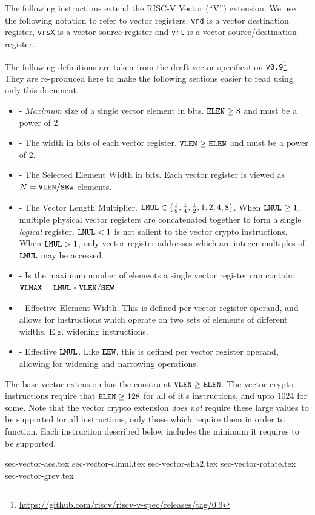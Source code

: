 
The following instructions extend the RISC-V Vector (``V'') extension.
We use the following notation to refer to vector registers:
{\tt vrd}  is a vector        destination register,
{\tt vrsX} is a vector source             register
and
{\tt vrt}  is a vector source/destination register.

The following definitions are taken from the draft
vector specification {\tt v0.9}\footnote{\url{https://github.com/riscv/riscv-v-spec/releases/tag/0.9}}.
They are re-produced here to make the following sections easier to
read using only this document.

\begin{itemize}
\item[\ELEN] - {\em Maximum} size of a single vector element in bits.
              ${\tt ELEN} \ge 8$ and must be a power of $2$.
\item[\VLEN] - The width in bits of each vector register.
              ${\tt VLEN} \ge {\tt ELEN}$ and must be a power of $2$.
\item[\SEW]  - The Selected Element Width in bits.
              Each vector register is viewed as $N={\tt VLEN}/{\tt SEW}$ elements.
\item[\LMUL] - The Vector Length Multiplier.
              ${\tt LMUL}\in\{{1\over 8},{1\over 4},{1\over 2},1,2,4,8\}$.
              When ${\tt LMUL}\ge1$, multiple physical vector registers are
              concatenated together to form a single {\em logical} register.
              ${\tt LMUL}<1$ is not salient to the vector crypto instructions.
              When ${\tt LMUL}>1$, only vector register addresses which are
              integer multiples of ${\tt LMUL}$ may be accessed.
\item[\VLMAX]- Is the maximum number of elements a single vector register
              can contain: ${\tt VLMAX}={\tt LMUL}*{\tt VLEN}/{\tt SEW}$.
\item[\EEW]  - Effective Element Width. This is defined per vector register
              operand, and allows for instructions which operate on
              two sets of elements of different widths. E.g. widening
              instructions.
\item[\EMUL] - Effective ${\tt LMUL}$. Like ${\tt EEW}$, this is defined per vector
              register operand, allowing for widening and narrowing
              operations.
\end{itemize}

The base vector extension has the constraint ${\tt VLEN} \ge {\tt ELEN}$.
The vector crypto instructions require that ${\tt ELEN} \ge 128$ for all
of it's instructions, and upto $1024$ for some.
Note that the vector crypto extension {\em does not} require these
large \ELEN values to be supported for all instructions, only those
which require them in order to function.
Each instruction described below includes the minimum \ELEN it
requires to be supported.


{sec-vector-aes.tex}
{sec-vector-clmul.tex}
{sec-vector-sha2.tex}
{sec-vector-rotate.tex}
{sec-vector-grev.tex}

